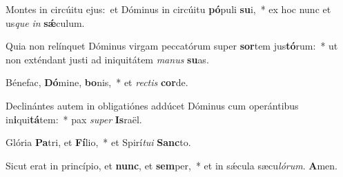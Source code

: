 Montes in circúitu ejus:~\reddagger et Dóminus in circúitu \textbf{pó}puli \textbf{su}i,~* ex hoc nunc et us\textit{que} \textit{in} \textbf{sǽ}culum.

Quia non relínquet Dóminus virgam peccatórum super \textbf{sor}tem jus\textbf{tó}rum:~* ut non exténdant justi ad iniquitátem \textit{ma}\textit{nus} \textbf{su}as.

Bénefac, \textbf{Dó}mine, \textbf{bo}nis,~* et \textit{rec}\textit{tis} \textbf{cor}de.

Declinántes autem in obligatiónes addúcet Dóminus cum operántibus in\textbf{i}qui\textbf{tá}tem:~* pax \textit{su}\textit{per} \textbf{Is}raël.

Glória \textbf{Pa}tri, et \textbf{Fí}lio,~* et Spirí\textit{tu}\textit{i} \textbf{Sanc}to.

Sicut erat in princípio, et \textbf{nunc}, et \textbf{sem}per,~* et in sǽcula sæcu\textit{ló}\textit{rum}. \textbf{A}men.

